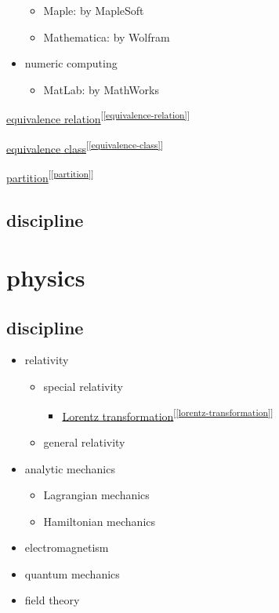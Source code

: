 \documentclass[
]{book}
\providecommand{\tightlist}{%
  \setlength{\itemsep}{0pt}\setlength{\parskip}{0pt}}
\theoremstyle{definition}
\theoremstyle{definition}
\theoremstyle{definition}
\theoremstyle{definition}
\theoremstyle{remark}
\begin{document}
\begin{itemize}
  \begin{itemize}
  \tightlist
  \item
    Maple: by MapleSoft
  \item
    Mathematica: by Wolfram
  \end{itemize}
\item
  numeric computing

  \begin{itemize}
  \tightlist
  \item
    MatLab: by MathWorks
  \end{itemize}
\end{itemize}

\protect\hyperlink{equivalence-relation}{equivalence relation}\textsuperscript{{[}\ref{equivalence-relation}{]}}

\protect\hyperlink{equivalence-class}{equivalence class}\textsuperscript{{[}\ref{equivalence-class}{]}}

\protect\hyperlink{partition}{partition}\textsuperscript{{[}\ref{partition}{]}}

\hypertarget{discipline}{%
\section{discipline}\label{discipline}}

\hypertarget{physics}{%
\chapter{physics}\label{physics}}

\hypertarget{discipline-1}{%
\section{discipline}\label{discipline-1}}

\begin{itemize}
\tightlist
\item
  relativity

  \begin{itemize}
  \tightlist
  \item
    special relativity

    \begin{itemize}
    \tightlist
    \item
      \protect\hyperlink{lorentz-transformation}{Lorentz transformation}\textsuperscript{{[}\ref{lorentz-transformation}{]}}
    \end{itemize}
  \item
    general relativity
  \end{itemize}
\item
  analytic mechanics

  \begin{itemize}
  \tightlist
  \item
    Lagrangian mechanics
  \item
    Hamiltonian mechanics
  \end{itemize}
\item
  electromagnetism
\item
  quantum mechanics
\item
  field theory
\end{itemize}
\end{document}
